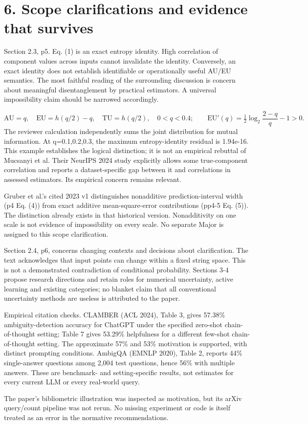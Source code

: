 \documentclass[10pt]{article}
\begin{document}
\section*{6. Scope clarifications and evidence that survives}
Section 2.3, p5. Eq. (1) is an exact entropy identity. High correlation of component values across inputs cannot invalidate the identity. Conversely, an exact identity does not establish identifiable or operationally useful AU/EU semantics. The most faithful reading of the surrounding discussion is concern about meaningful disentanglement by practical estimators. A universal impossibility claim should be narrowed accordingly.\par
\[\mathrm{AU}=q,\quad \mathrm{EU}=h(q/2)-q,\quad\mathrm{TU}=h(q/2),\quad 0<q<0.4;\qquad \mathrm{EU}'(q)=\tfrac12\log_2\!\frac{2-q}{q}-1>0.\] The reviewer calculation independently sums the joint distribution for mutual information. At q=0.1,0.2,0.3, the maximum entropy-identity residual is 1.94e-16. This example establishes the logical distinction; it is not an empirical rebuttal of Mucsanyi et al. Their NeurIPS 2024 study explicitly allows some true-component correlation and reports a dataset-specific gap between it and correlations in assessed estimators. Its empirical concern remains relevant.\par
Gruber et al.’s cited 2023 v1 distinguishes nonadditive prediction-interval width (p4 Eq. (4)) from exact additive mean-square-error contributions (pp4-5 Eq. (5)). The distinction already exists in that historical version. Nonadditivity on one scale is not evidence of impossibility on every scale. No separate Major is assigned to this scope clarification.\par
Section 2.4, p6, concerns changing contexts and decisions about clarification. The text acknowledges that input points can change within a fixed string space. This is not a demonstrated contradiction of conditional probability. Sections 3-4 propose research directions and retain roles for numerical uncertainty, active learning and existing categories; no blanket claim that all conventional uncertainty methods are useless is attributed to the paper.\par
Empirical citation checks. CLAMBER (ACL 2024), Table 3, gives 57.38\% ambiguity-detection accuracy for ChatGPT under the specified zero-shot chain-of-thought setting; Table 7 gives 53.29\% helpfulness for a different few-shot chain-of-thought setting. The approximate 57\% and 53\% motivation is supported, with distinct prompting conditions. AmbigQA (EMNLP 2020), Table 2, reports 44\% single-answer questions among 2,004 test questions, hence 56\% with multiple answers. These are benchmark- and setting-specific results, not estimates for every current LLM or every real-world query.\par
The paper’s bibliometric illustration was inspected as motivation, but its arXiv query/count pipeline was not rerun. No missing experiment or code is itself treated as an error in the normative recommendations.\par
\end{document}
